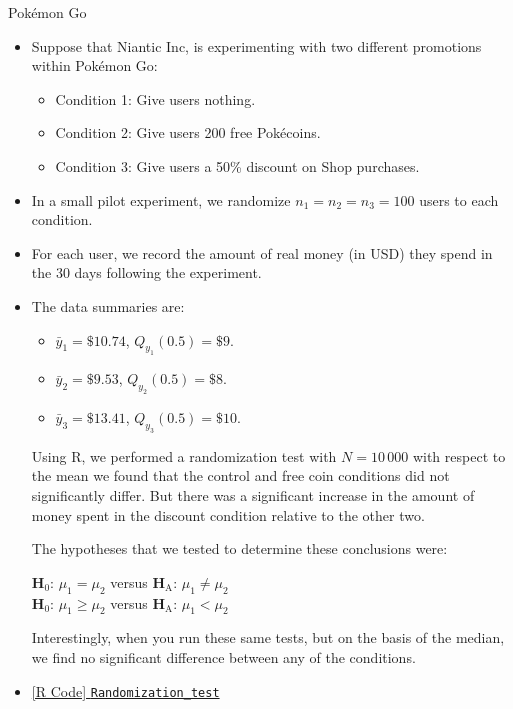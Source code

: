 \begin{Example}{Pokémon Go}{}
    \begin{itemize}
        \item Suppose that Niantic Inc, is experimenting with two different promotions within Pokémon
              Go:
              \begin{itemize}
                  \item Condition 1: Give users nothing.
                  \item Condition 2: Give users 200 free Pokécoins.
                  \item Condition 3: Give users a 50\% discount on Shop purchases.
              \end{itemize}
        \item In a small pilot experiment, we randomize $ n_1=n_2=n_3=100 $ users to each condition.
        \item For each user, we record the amount of real money (in USD) they spend in the 30 days
              following the experiment.
        \item The data summaries are:
              \begin{itemize}
                  \item $ \bar{y}_1=\$10.74 $, $ Q_{y_1}(0.5)=\$9 $.
                  \item $ \bar{y}_2=\$9.53 $, $ Q_{y_2}(0.5)=\$8 $.
                  \item $ \bar{y}_3=\$13.41 $, $ Q_{y_3}(0.5)=\$10 $.
              \end{itemize}
              Using R, we performed a randomization test with $ N=10\,000 $ with respect to the mean
              we found that the control and free coin conditions did not significantly differ.
              But there was a significant increase in the amount of money spent in the discount condition
              relative to the other two.

              \vspace{2mm}

              The hypotheses that we tested to determine these conclusions were:
              \begin{tightcenter}
                  $ \mathbf{H}_0 $: $ \mu_1=\mu_2 $ versus $ \mathbf{H}_\text{A} $: $ \mu_1\ne \mu_2 $\\
                  $ \mathbf{H}_0 $: $ \mu_1\ge \mu_2 $ versus $ \mathbf{H}_\text{A} $: $ \mu_1<\mu_2 $
              \end{tightcenter}
              Interestingly, when you run these same tests, but on the basis of the median, we find
              no significant difference between any of the conditions.
        \item \href{https://github.com/Hextical/university-notes/blob/master/year-3/semester-3/STAT 430/code/W3/Randomization_test.R}{[R Code] \texttt{Randomization\_test}}
    \end{itemize}
\end{Example}
